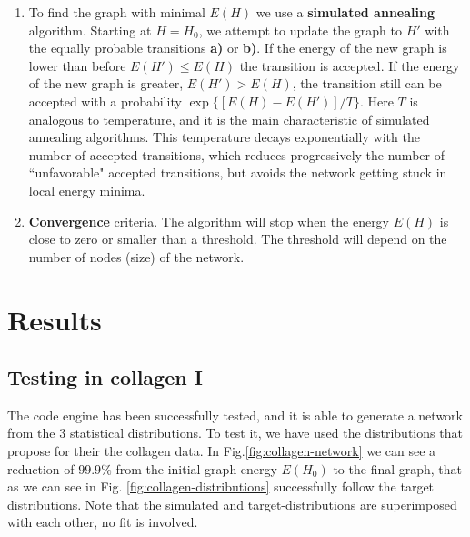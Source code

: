 \begin{enumerate}[label=\textbf{\Roman*}]
  \item To find the graph with minimal $E(H)$ we use a \textbf{simulated
  annealing} algorithm. Starting at $H=H_0$, we attempt to update the graph to
  $H'$ with the equally probable transitions \textbf{a)} or \textbf{b)}.  If the
  energy of the new graph is lower than before $E(H')\leq E(H)$ the transition
  is accepted. If the energy of the new graph is greater, $E(H')> E(H)$, the
  transition still can be accepted with a probability $\exp\{[E(H)-E(H')]/T\}$.
  Here $T$ is  analogous to temperature, and it is the main characteristic of
  simulated annealing algorithms. This temperature decays exponentially with the number of accepted transitions, which reduces
  progressively the number of ``unfavorable" accepted transitions, but avoids
  the network getting stuck in local energy minima.
  \item \textbf{Convergence} criteria. The algorithm will stop when the energy
  $E(H)$ is close to zero or smaller than a threshold.
  The threshold will depend on the number of nodes (size) of the network.
\end{enumerate} 

\section{Results}
\subsection{Testing in collagen I}
The code engine has been successfully tested, and it is able to
generate a network from the $3$ statistical distributions. To test it, we have
used the distributions that \citet{lindstrom_biopolymer_2010} propose for their
the collagen data. In Fig.\ref{fig:collagen-network} we
can see a reduction of $99.9\%$ from the initial graph energy $E(H_0)$ to the
final graph, that as we can see in Fig.
\ref{fig:collagen-distributions} successfully follow the target distributions. 
Note that the
simulated and target-distributions are superimposed with each other, no fit is involved. 

